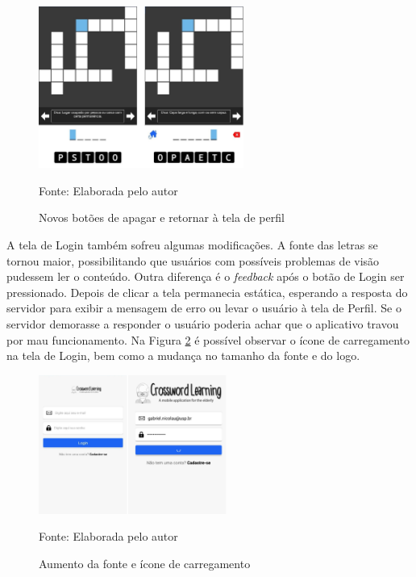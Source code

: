 \begin{figure}[H]
\centering
    \caption{Novos botões de apagar e retornar à tela de perfil}
    \label{fig:cross-old-new}
    \includegraphics[width=0.6\textwidth]{Figuras/cross-old-new.jpg}
    
    Fonte: Elaborada pelo autor
\end{figure}

A tela de Login também sofreu algumas modificações. A fonte das letras se tornou maior, possibilitando que usuários com possíveis problemas de visão pudessem ler o conteúdo. Outra diferença é o \textit{feedback} após o botão de Login ser pressionado. Depois de clicar a tela permanecia estática, esperando a resposta do servidor para exibir a mensagem de erro ou levar o usuário à tela de Perfil. Se o servidor demorasse a responder o usuário poderia achar que o aplicativo travou por mau funcionamento. Na Figura \ref{fig:login-old-new} é possível observar o ícone de carregamento na tela de Login, bem como a mudança no tamanho da fonte e do logo.

\begin{figure}[H]
\centering
    \caption{Aumento da fonte e ícone de carregamento}
    \label{fig:login-old-new}
    \includegraphics[width=0.55\textwidth]{Figuras/login-old-new.jpg}
    
    Fonte: Elaborada pelo autor
\end{figure}

